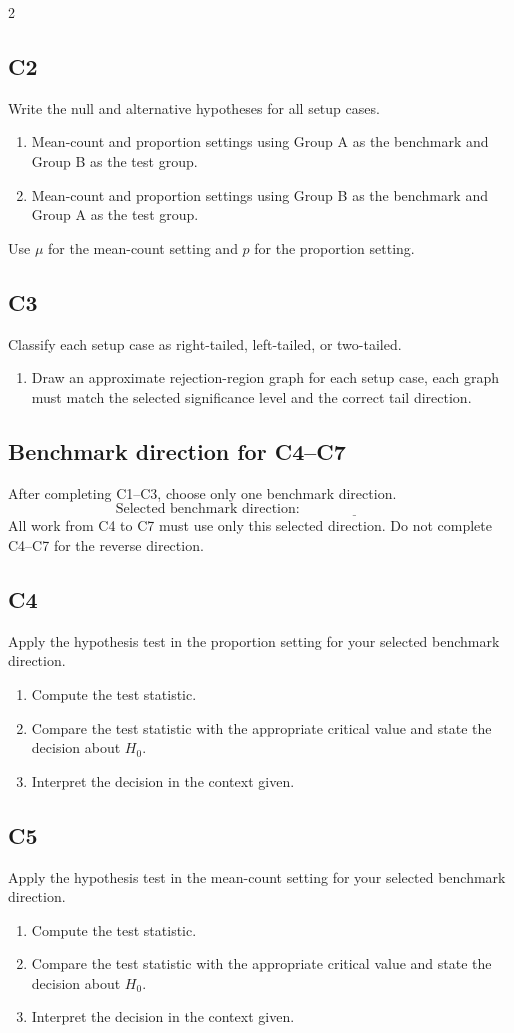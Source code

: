 \documentclass[12pt]{article}
\begin{document}
\begin{multicols}{2}
	\subsection*{C2}
	Write the null and alternative hypotheses for all setup cases.
	\begin{enumerate}
		\item Mean-count and proportion settings using Group A as the benchmark and Group B as the test group.
		\item Mean-count and proportion settings using Group B as the benchmark and Group A as the test group.
	\end{enumerate}
	Use \(\mu\) for the mean-count setting and \(p\) for the proportion setting.
	\subsection*{C3}
	Classify each setup case as right-tailed, left-tailed, or two-tailed.
	\begin{enumerate}
		\item Draw an approximate rejection-region graph for each setup case, each graph must match the selected significance level and the correct tail direction.
	\end{enumerate}
	\subsection*{Benchmark direction for C4--C7}
	After completing C1--C3, choose only one benchmark direction.
	\[
	\text{Selected benchmark direction: } \underline{\hspace{3cm}}
	\]
	All work from C4 to C7 must use only this selected direction. Do not complete C4--C7 for the reverse direction.
	\subsection*{C4}
	Apply the hypothesis test in the proportion setting for your selected benchmark direction.
	\begin{enumerate}
		\item Compute the test statistic.
		\item Compare the test statistic with the appropriate critical value and state the decision about \(H_0\).
		\item Interpret the decision in the context given.
	\end{enumerate}
	\subsection*{C5}
	Apply the hypothesis test in the mean-count setting for your selected benchmark direction.
	\begin{enumerate}
		\item Compute the test statistic.
		\item Compare the test statistic with the appropriate critical value and state the decision about \(H_0\).
		\item Interpret the decision in the context given.
	\end{enumerate}

\end{multicols}
\end{document}
